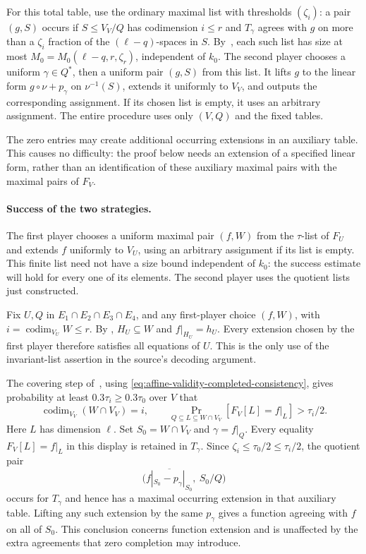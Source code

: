 For this total table, use the ordinary maximal list with thresholds
$(\zeta_i)$: a pair $(g,S)$ occurs if $S\le V_V/Q$ has codimension
$i\le r$ and $T_\gamma$ agrees with $g$ on more than a $\zeta_i$
fraction of the $(\ell-q)$-spaces in $S$.
By~\cite[Lemma~3.12]{DKKMS25}, each such list has size at most
$M_0=M_0(\ell-q,r,\zeta_r)$, independent of $k_0$.
The second player chooses a uniform $\gamma\in Q^*$, then a uniform
pair $(g,S)$ from this list.  It lifts $g$ to the linear form
$g\circ\nu+p_\gamma$ on $\nu^{-1}(S)$, extends it uniformly to
$V_V$, and outputs the corresponding assignment.  If its chosen list
is empty, it uses an arbitrary assignment.  The entire procedure uses
only $(V,Q)$ and the fixed tables.

The zero entries may create additional occurring extensions in an
auxiliary table.  This causes no difficulty: the proof below needs
an extension of a specified linear form, rather than an identification
of these auxiliary maximal pairs with the maximal pairs of $F_V$.

\paragraph{Success of the two strategies.}
The first player chooses a uniform maximal pair $(f,W)$ from the
$\tau$-list of $F_U$ and extends $f$ uniformly to $V_U$, using an
arbitrary assignment if its list is empty.  This finite list need not
have a size bound independent of $k_0$: the success estimate will hold
for every one of its elements.  The second player uses the quotient
lists just constructed.

Fix $U,Q$ in $E_1\cap E_2\cap E_3\cap E_4$, and any first-player
choice $(f,W)$, with $i=\operatorname{codim}_{V_U}W\le r$.
By , $H_U\subseteq W$ and
$f|_{H_U}=h_U$.  Every extension chosen by the first player therefore
satisfies all equations of $U$.  This is the only use of the
invariant-list assertion in the source's decoding argument.

The covering step of~\cite[Lemmas~4.11 and~5.5 and the proof of
Lemma~5.3]{DKKMS25}, using
\eqref{eq:affine-validity-completed-consistency}, gives probability at
least $0.3\tau_i\ge0.3\tau_0$ over $V$ that
\[
 \operatorname{codim}_{V_V}(W\cap V_V)=i,
 \qquad
 \Pr_{Q\subseteq L\subseteq W\cap V_V}
       [F_V[L]=f|_L]>\tau_i/2.
\]
Here $L$ has dimension $\ell$.  Set $S_0=W\cap V_V$ and
$\gamma=f|_Q$.  Every equality $F_V[L]=f|_L$ in this display is
retained in $T_\gamma$.  Since
$\zeta_i\le\tau_0/2\le\tau_i/2$, the quotient pair
\[
 \bigl(\overline{f|_{S_0}-p_\gamma|_{S_0}},\ S_0/Q\bigr)
\]
occurs for $T_\gamma$ and hence has a maximal occurring extension
in that auxiliary table.  Lifting any such extension by the same
$p_\gamma$ gives a function agreeing with $f$ on all of $S_0$.
This conclusion concerns function extension and is unaffected by
the extra agreements that zero completion may introduce.

